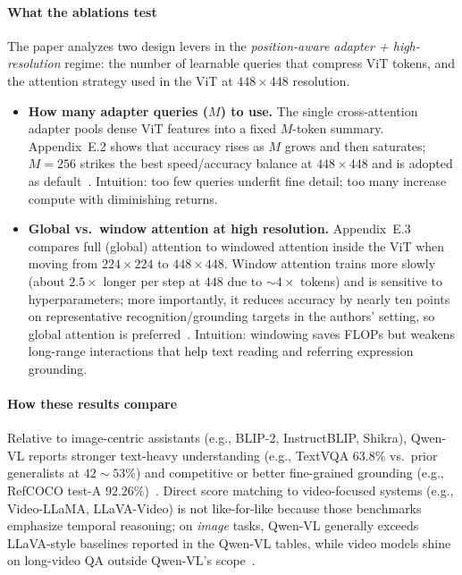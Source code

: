 \begin{enrichment}
\begin{enrichment}
        \paragraph{What the ablations test}
        The paper analyzes two design levers in the \emph{position\mbox{-}aware adapter + high\mbox{-}resolution} regime: the number of learnable queries that compress ViT tokens, and the attention strategy used in the ViT at $448{\times}448$ resolution.
        \begin{itemize}
            \item \textbf{How many adapter queries ($M$) to use.} The single cross\mbox{-}attention adapter pools dense ViT features into a fixed $M$\mbox{-}token summary. Appendix~E.2 shows that accuracy rises as $M$ grows and then saturates; $M{=}256$ strikes the best speed/accuracy balance at $448{\times}448$ and is adopted as default~\cite[Sec.~2.1; Appx.~E.2]{bai2023_qwenvl}. Intuition: too few queries underfit fine detail; too many increase compute with diminishing returns.
            \item \textbf{Global vs.\ window attention at high resolution.} Appendix~E.3 compares full (global) attention to windowed attention inside the ViT when moving from $224{\times}224$ to $448{\times}448$. Window attention trains more slowly (about $2.5{\times}$ longer per step at $448$ due to $\sim 4{\times}$ tokens) and is sensitive to hyperparameters; more importantly, it reduces accuracy by nearly ten points on representative recognition/grounding targets in the authors’ setting, so global attention is preferred~\cite[Sec.~3.2; Appx.~E.3]{bai2023_qwenvl}. Intuition: windowing saves FLOPs but weakens long\mbox{-}range interactions that help text reading and referring expression grounding.
        \end{itemize}
        
        \newpage
        
        \paragraph{How these results compare}
        Relative to image\mbox{-}centric assistants (e.g., BLIP\mbox{-}2, InstructBLIP, Shikra), Qwen\mbox{-}VL reports stronger text\mbox{-}heavy understanding (e.g., TextVQA $63.8\%$ vs.\ prior generalists at $42{\sim}53\%$) and competitive or better fine\mbox{-}grained grounding (e.g., RefCOCO test\mbox{-}A $92.26\%$)~\cite[Tables~4--6]{bai2023_qwenvl}. Direct score matching to video\mbox{-}focused systems (e.g., Video\mbox{-}LLaMA, LLaVA\mbox{-}Video) is not like\mbox{-}for\mbox{-}like because those benchmarks emphasize temporal reasoning; on \emph{image} tasks, Qwen\mbox{-}VL generally exceeds LLaVA\mbox{-}style baselines reported in the Qwen\mbox{-}VL tables, while video models shine on long\mbox{-}video QA outside Qwen\mbox{-}VL’s scope~\cite[Fig.~1; Tables~4--7]{bai2023_qwenvl}.
        

\end{enrichment}
\end{enrichment}

